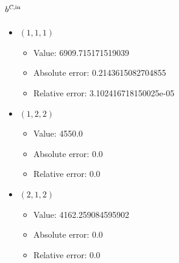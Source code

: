 \documentclass{article}%
\begin{document}
\subsection{$b^{\textsl{C},\text{in}}$}%
\begin{itemize}%
	\item $(1, 1, 1)$%
	\begin{itemize}%
		\item Value: 6909.715171519039%
		\item Absolute error: 0.2143615082704855%
		\item Relative error: 3.102416718150025e-05%
	\end{itemize}%
	\item $(1, 2, 2)$%
	\begin{itemize}%
		\item Value: 4550.0%
		\item Absolute error: 0.0%
		\item Relative error: 0.0%
	\end{itemize}%
	\item $(2, 1, 2)$%
	\begin{itemize}%
		\item Value: 4162.259084595902%
		\item Absolute error: 0.0%
		\item Relative error: 0.0%
	\end{itemize}%
\end{itemize}%
\end{document}
